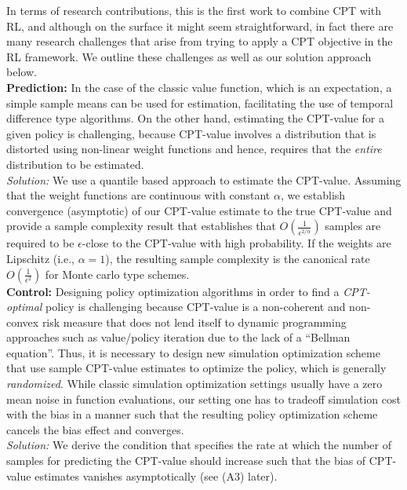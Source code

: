 \documentclass[11pt,letterpaper,english]{article}
\begin{document}
In terms of research contributions, this is the first work to combine CPT with RL, and although on the surface it might seem straightforward, in fact there are many research challenges that arise from trying to apply a CPT objective in the RL framework. We outline these challenges as well as our solution approach below. \\
\textbf{Prediction:} In the case of the classic value function, which is an expectation, a simple sample means can be used for estimation, facilitating the use of temporal difference type algorithms. On the other hand, estimating the CPT-value for a given policy is challenging, because 
CPT-value   involves a distribution that is distorted using non-linear weight functions and hence, 
requires that the \textit{entire} distribution to be estimated.\\ 
\textit{Solution:} 
We use a quantile based approach to estimate the CPT-value.
Assuming that the weight functions are \holder continuous with constant $\alpha$,  we establish convergence (asymptotic) of our CPT-value estimate to the true CPT-value and provide a sample complexity result that establishes that  $O\left(\frac1{\epsilon^{2/\alpha}}\right)$ samples are required to be $\epsilon$-close to the CPT-value with high probability. If the weights are Lipschitz (i.e., $\alpha=1$), the resulting sample complexity is the canonical rate $O\left(\frac1{\epsilon^2}\right)$ for Monte carlo type schemes.\\
\textbf{Control:} 
Designing policy optimization algorithms in order to find a \textit{CPT-optimal} policy is challenging because CPT-value is a non-coherent and non-convex risk measure that does not lend itself to dynamic programming approaches such as value/policy iteration due to the lack of a ``Bellman equation''. 
Thus, it is necessary to design new simulation optimization scheme that use sample CPT-value estimates to optimize the policy, which is generally \textit{randomized}. While classic simulation optimization settings usually have a zero mean noise in function evaluations, our setting one has to tradeoff simulation cost with the bias in a manner such that the resulting policy optimization scheme cancels the bias effect and converges. \\
\textit{Solution:} 
We derive the condition that specifies the rate at which the number of samples for predicting the CPT-value should increase such that the bias of CPT-value estimates vanishes asymptotically (see (A3) later).
\end{document}
